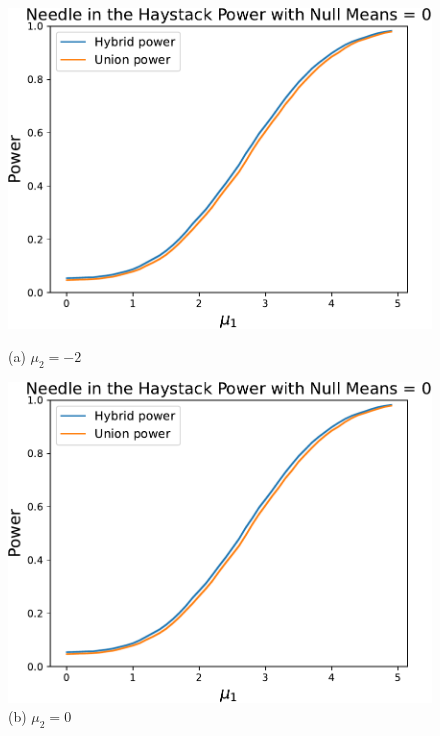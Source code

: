 \documentclass{article}
\begin{document}
\begin{appendix}
\begin{figure}
    \centering
    \hspace{-0.035\textwidth}
    \begin{minipage}{0.32\textwidth}
        \centering
        \includegraphics[width=\textwidth]{fig/hybrid_vs_union_null=0.pdf}
        \caption*{(a) $\mu_2 = -2$}
    \end{minipage}
    \hfill
    \hspace{0.01\textwidth}
    \begin{minipage}{0.32\textwidth}
        \centering
        \includegraphics[width=\textwidth]{fig/hybrid_vs_union_null=0.pdf}
        \caption*{(b) $\mu_2 = 0$}
    \end{minipage}

\end{figure}
\end{appendix}
\end{document}
